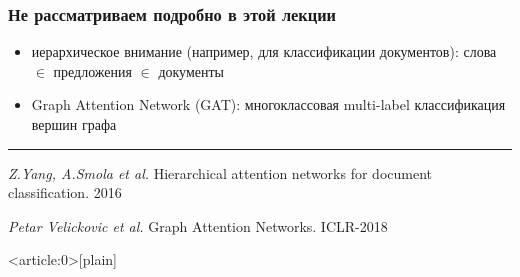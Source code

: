\documentclass[fullscreen=true, bookmarks=true, hyperref={pdfencoding=unicode}]{beamer}
\begin{document}
\begin{frame}
  \frametitle{Не рассматриваем подробно в этой лекции}

  \begin{itemize}
    \item иерархическое внимание (например, для классификации документов):  слова  $\in$ предложения $\in$ документы
    \item Graph Attention Network (GAT): многоклассовая multi-label классификация вершин графа
  \end{itemize}
  \vspace{2cm}

  \noindent\rule{8cm}{0.4pt}

  {\small
  {\it Z.Yang, A.Smola et al.} Hierarchical attention networks for document classification. 2016

  {\it Petar Velickovic et al.} Graph Attention Networks. ICLR-2018}
\end{frame}


{ %
    \begin{frame}<article:0>[plain]
     \end{frame}
}
\end{document}
